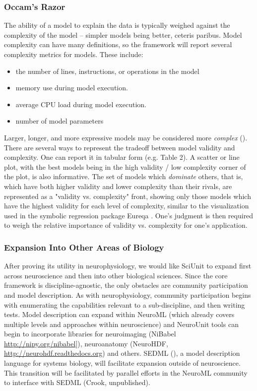\documentclass[11pt,letterpaper]{article}
\begin{document}
\subsubsection{Occam's Razor}
The ability of a model to explain the data is typically weighed against the complexity of the model -- simpler models being better, ceteris paribus.  Model complexity can have many definitions, so the framework will report several complexity metrics for models.  These include:
\begin{itemize}
\item the number of lines, instructions, or operations in the model
\item memory use during model execution.  
\item average CPU load during model execution.  
\item number of model parameters
\end{itemize}
Larger, longer, and more expressive models may be considered more \textit{complex} (\cite{McCabe1976}).  There are several ways to represent the tradeoff between model validity and complexity.  One can report it in tabular form (e.g. Table 2).  A scatter or line plot, with the best models being in the high validity / low complexity corner of the plot, is also informative.  The set of models which \textit{dominate} others, that is, which have both higher validity and lower complexity than their rivals, are represented as a "validity vs. complexity" front, showing only those models which have the highest validity for each level of complexity, similar to the visualization used in the symbolic regression package Eureqa \cite{schmidt2009}.  One's judgment is then required to weigh the relative importance of validity vs. complexity for one's application.  

\subsubsection{Expansion Into Other Areas of Biology}
After proving its utility in neurophysiology, we would like SciUnit to expand first across neuroscience and then into other biological sciences.  Since the core framework is discipline-agnostic, the only obstacles are community participation and model description.  As with neurophysiology, community participation begins with enumerating the capabilities relevant to a sub-discipline, and then writing tests.  Model description can expand within NeuroML (which already covers multiple levels and approaches within neuroscience) and NeuroUnit tools can begin to incorporate libraries for neuroimaging (NiBabel \url{http://nipy.org/nibabel}]), neuroanatomy (NeuroHDF, \url{http://neurohdf.readthedocs.org}) and others.  SEDML (\cite{hucka2003}), a model description language for systems biology, will facilitate expansion outside of neuroscience.  This transition will be facilitated by parallel efforts in the NeuroML community to interface with SEDML (Crook, unpublished).  
\end{document}
